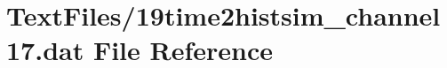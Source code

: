 \hypertarget{19time2histsim__channel17_8dat}{}\section{Text\+Files/19time2histsim\+\_\+channel17.dat File Reference}
\label{19time2histsim__channel17_8dat}
